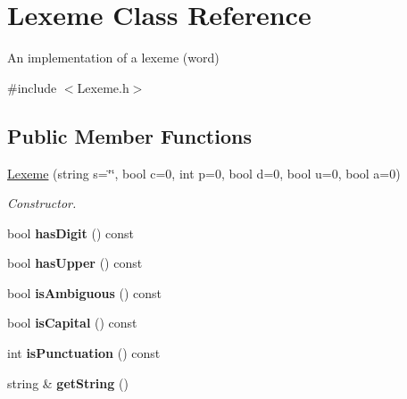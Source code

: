\hypertarget{classLexeme}{}\section{Lexeme Class Reference}
\label{classLexeme}


An implementation of a lexeme (word)  




{\ttfamily \#include $<$Lexeme.\+h$>$}

\subsection*{Public Member Functions}
\begin{DoxyCompactItemize}
\item 
\mbox{\label{classLexeme_a91ec217d9cc9c11b33597705b1f2ef88}} 
\hyperlink{classLexeme_a91ec217d9cc9c11b33597705b1f2ef88}{Lexeme} (string s=\char`\"{}\char`\"{}, bool c=0, int p=0, bool d=0, bool u=0, bool a=0)
\begin{DoxyCompactList}\small\item\em Constructor. \end{DoxyCompactList}\item 
\mbox{\label{classLexeme_a01b2154c183663f7e298b564d14a907e}} 
bool {\bfseries has\+Digit} () const
\item 
\mbox{\label{classLexeme_a5b40ad2f0863cbae11b0dd2c7876d8e8}} 
bool {\bfseries has\+Upper} () const
\item 
\mbox{\label{classLexeme_a6319c062333968f1d47f69d7fd44900c}} 
bool {\bfseries is\+Ambiguous} () const
\item 
\mbox{\label{classLexeme_afa5bf60e2cd601b4755cc137c56f7aed}} 
bool {\bfseries is\+Capital} () const
\item 
\mbox{\label{classLexeme_a67fb5732247889cb97612dd327c7a194}} 
int {\bfseries is\+Punctuation} () const
\item 
\mbox{\label{classLexeme_ac3bedb54fb40b5b7d85edb3cf2d715db}} 
string \& {\bfseries get\+String} ()
\item 
\mbox{\label{classLexeme_a8fd310c078c13d53dc601c299d0acb78}} 

\end{DoxyCompactItemize}
